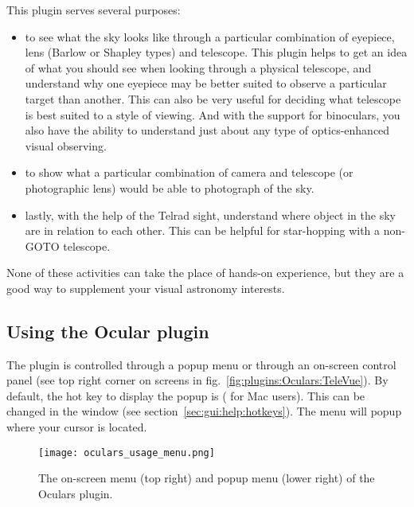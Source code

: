 This plugin serves several purposes:
\begin{itemize}
\item to see what the sky looks like through a particular combination of eyepiece, 
  lens (Barlow or Shapley types) and telescope. This plugin helps to get an idea of 
  what you should see when looking through a physical telescope, and understand why 
  one eyepiece may be better suited to observe a particular target than another. 
  This can also be very useful for deciding what telescope is best suited to a style of viewing. 
  And with the support for binoculars, you also have the ability to understand just about any type of optics-enhanced visual observing.
\item to show what a particular combination of camera and telescope (or photographic lens) would be able to photograph of the sky. 
\item lastly, with the help of the Telrad sight, understand where object in the sky are in relation to each other. 
This can be helpful for star-hopping with a non-GOTO telescope. 
\end{itemize}

\noindent None of these activities can take the place of hands-on experience, but they are a good way to supplement your visual astronomy interests.

\subsection{Using the Ocular plugin}
\label{sec:sec:plugins:Oculars:UsingPlugin}

The plugin is controlled through a popup menu or through an on-screen control panel (see top right corner on screens in fig.~\ref{fig:plugins:Oculars:TeleVue}). 
By default, the hot key to display the popup is  ( for Mac users). 
This can be changed in the  window (see section~\ref{sec:gui:help:hotkeys}). The menu will popup where your cursor is located.

\begin{figure}[t]\centering
\texttt{[image: oculars\_usage\_menu.png]}
\caption{The on-screen menu (top right) and popup menu (lower right) of the Oculars plugin.}
\label{fig:plugins:Oculars:Usage:Menu}
\end{figure}


